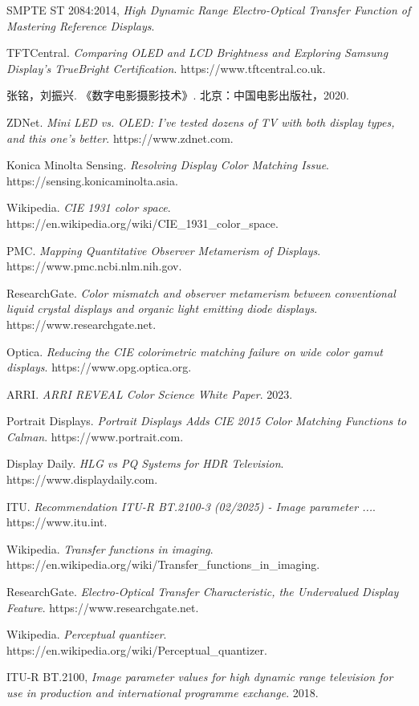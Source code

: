 \documentclass[12pt, a4paper]{ctexart}
\begin{document}
{\begin{enumerate}[label={[\arabic*]}]
    \item SMPTE ST 2084:2014, \textit{High Dynamic Range Electro-Optical Transfer Function of Mastering Reference Displays}.
    \item TFTCentral. \textit{Comparing OLED and LCD Brightness and Exploring Samsung Display's TrueBright Certification}. https://www.tftcentral.co.uk.
    \item 张铭，刘振兴. 《数字电影摄影技术》. 北京：中国电影出版社，2020.
    \item ZDNet. \textit{Mini LED vs. OLED: I've tested dozens of TV with both display types, and this one's better}. https://www.zdnet.com.
    \item Konica Minolta Sensing. \textit{Resolving Display Color Matching Issue}. https://sensing.konicaminolta.asia.
    \item Wikipedia. \textit{CIE 1931 color space}. https://en.wikipedia.org/wiki/CIE\_1931\_color\_space.
    \item PMC. \textit{Mapping Quantitative Observer Metamerism of Displays}. https://www.pmc.ncbi.nlm.nih.gov.
    \item ResearchGate. \textit{Color mismatch and observer metamerism between conventional liquid crystal displays and organic light emitting diode displays}. https://www.researchgate.net.
    \item Optica. \textit{Reducing the CIE colorimetric matching failure on wide color gamut displays}. https://www.opg.optica.org.
    \item ARRI. \textit{ARRI REVEAL Color Science White Paper}. 2023.
    \item Portrait Displays. \textit{Portrait Displays Adds CIE 2015 Color Matching Functions to Calman}. https://www.portrait.com.
    \item Display Daily. \textit{HLG vs PQ Systems for HDR Television}. https://www.displaydaily.com.
    \item ITU. \textit{Recommendation ITU-R BT.2100-3 (02/2025) - Image parameter ...}. https://www.itu.int.
    \item Wikipedia. \textit{Transfer functions in imaging}. https://en.wikipedia.org/wiki/Transfer\_functions\_in\_imaging.
    \item ResearchGate. \textit{Electro‐Optical Transfer Characteristic, the Undervalued Display Feature}. https://www.researchgate.net.
    \item Wikipedia. \textit{Perceptual quantizer}. https://en.wikipedia.org/wiki/Perceptual\_quantizer.
    \item ITU-R BT.2100, \textit{Image parameter values for high dynamic range television for use in production and international programme exchange}. 2018.

\end{enumerate}}
\end{document}
